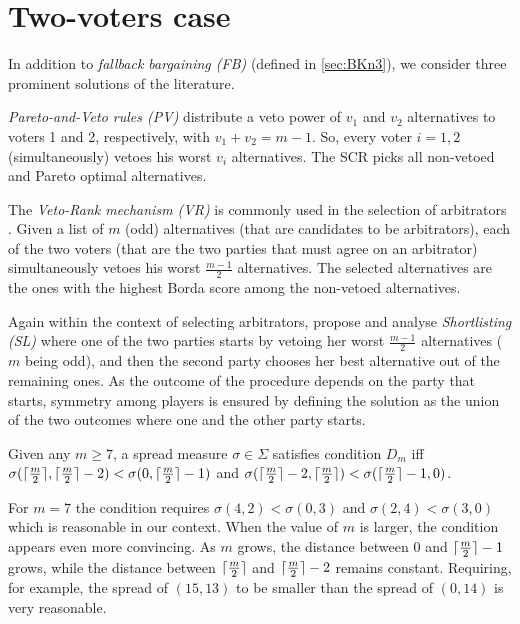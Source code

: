 \documentclass[version=3.21, pagesize, twoside=off, bibliography=totoc, DIV=calc, fontsize=12pt, a4paper]{scrartcl}
\begin{document}
\section{Two-voters case}
In addition to \emph{fallback bargaining (FB)} \citep{Brams2001} (defined in \cref{sec:BKn3}), we consider three prominent solutions of the literature.

\emph{Pareto-and-Veto rules (PV)} \citep{Moulin1983, Abreu1991, Laslier2020} distribute a veto power of $v_1$ and $v_2$ alternatives to voters 1 and 2, respectively, with $v_1+v_2=m-1$. So, every voter $i=1,2$ (simultaneously) vetoes his worst $v_i$ alternatives. The \ac{SCR} picks all non-vetoed and Pareto optimal alternatives.

The \emph{Veto-Rank mechanism (VR)} is commonly used in the selection of arbitrators \citep{Clippel2014}. Given a list of $m$ (odd) alternatives (that are candidates to be arbitrators), each of the two voters (that are the two parties that must agree on an arbitrator) simultaneously vetoes his worst $\frac{m-1}{2}$ alternatives. The selected alternatives are the ones with the highest Borda score among the non-vetoed alternatives.

Again within the context of selecting arbitrators, \citet{Clippel2014} propose and analyse \emph{Shortlisting (SL)} where one of the two parties starts by vetoing her worst $\frac{m-1}{2}$ alternatives ($m$ being odd), and then the second party chooses her best alternative out of the remaining ones. As the outcome of the procedure depends on the party that starts, symmetry among players is ensured by defining the solution as the union of the two outcomes where one and the other party starts.


\begin{definition}
    Given any $m \geq 7$, a spread measure $\sigma \in \Sigma$ satisfies condition $D_m$ iff 
    $\sigma(\lceil\frac{m}{2}\rceil, \lceil\frac{m}{2}\rceil - 2) < \sigma(0, \lceil\frac{m}{2}\rceil - 1)$ and 
    $\sigma(\lceil\frac{m}{2}\rceil - 2, \lceil\frac{m}{2}\rceil) < \sigma(\lceil\frac{m}{2}\rceil - 1, 0)$.
\end{definition}

For $m=7$ the condition requires $\sigma(4, 2) < \sigma(0, 3)$ and $\sigma(2, 4) < \sigma(3, 0)$ which is reasonable in our context. When the value of $m$ is larger, the condition appears even more convincing. As $m$ grows, the distance between $0$ and $\lceil\frac{m}{2}\rceil - 1$ grows, while the distance between $\lceil\frac{m}{2}\rceil$ and $\lceil\frac{m}{2}\rceil - 2$ remains constant. Requiring, for example, the spread of $(15, 13)$ to be smaller than the spread of $(0, 14)$ is very reasonable.
\end{document}
